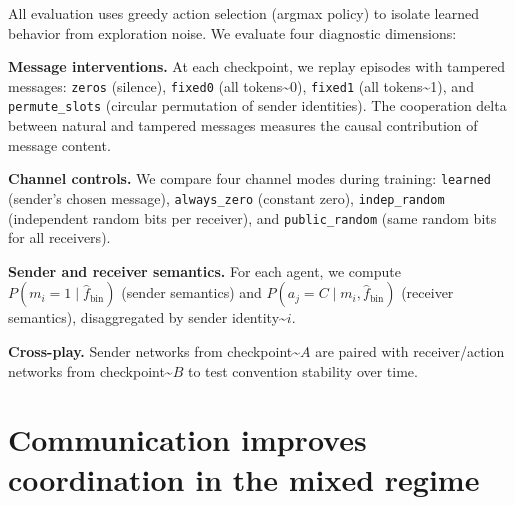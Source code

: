 \documentclass[
  10pt,
  letterpaper,
]{article}
\newcommand{\fhat}{\hat{f}}
\begin{document}
All evaluation uses greedy action selection (argmax policy) to isolate
learned behavior from exploration noise. We evaluate four diagnostic
dimensions:

\textbf{Message interventions.} At each checkpoint, we replay episodes
with tampered messages: \texttt{zeros} (silence), \texttt{fixed0} (all
tokens\textasciitilde0), \texttt{fixed1} (all tokens\textasciitilde1),
and \texttt{permute\_slots} (circular permutation of sender identities).
The cooperation delta between natural and tampered messages measures the
causal contribution of message content.

\textbf{Channel controls.} We compare four channel modes during
training: \texttt{learned} (sender's chosen message),
\texttt{always\_zero} (constant zero), \texttt{indep\_random}
(independent random bits per receiver), and \texttt{public\_random}
(same random bits for all receivers).

\textbf{Sender and receiver semantics.} For each agent, we compute
\(P(m_i = 1 \mid \fhat_{\text{bin}})\) (sender semantics) and
\(P(a_j = C \mid m_i, \fhat_{\text{bin}})\) (receiver semantics),
disaggregated by sender identity\textasciitilde{}\(i\).

\textbf{Cross-play.} Sender networks from
checkpoint\textasciitilde{}\(A\) are paired with receiver/action
networks from checkpoint\textasciitilde{}\(B\) to test convention
stability over time.

\hypertarget{sec-main-result}{%
\section{Communication improves coordination in the mixed
regime}\label{sec-main-result}}
\end{document}
